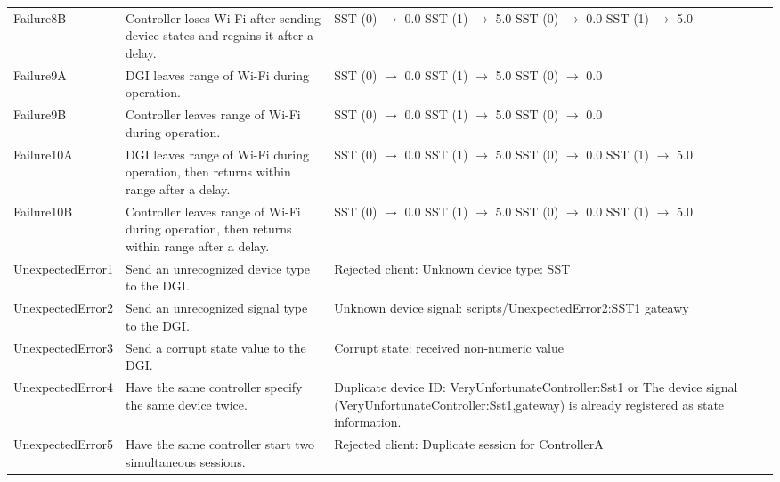 \documentclass{article}
\begin{document}
\begin{center}
\begin{footnotesize}
\begin{longtable}{|p{3cm}|p{4cm}|p{10cm}|c|}
    Failure8B & Controller loses Wi-Fi after sending device states and regains it after a delay. & SST (0) $\rightarrow$ 0.0 \newline SST (1) $\rightarrow$ 5.0 \newline SST (0) $\rightarrow$ 0.0 \newline SST (1) $\rightarrow$ 5.0 & \\
    Failure9A & DGI leaves range of Wi-Fi during operation. & SST (0) $\rightarrow$ 0.0 \newline SST (1) $\rightarrow$ 5.0 \newline SST (0) $\rightarrow$ 0.0 & \\
    Failure9B & Controller leaves range of Wi-Fi during operation. & SST (0) $\rightarrow$ 0.0 \newline SST (1) $\rightarrow$ 5.0 \newline SST (0) $\rightarrow$ 0.0 & \\
    Failure10A & DGI leaves range of Wi-Fi during operation, then returns within range after a delay. & SST (0) $\rightarrow$ 0.0 \newline SST (1) $\rightarrow$ 5.0 \newline SST (0) $\rightarrow$ 0.0 \newline SST (1) $\rightarrow$ 5.0 & \\
    Failure10B & Controller leaves range of Wi-Fi during operation, then returns within range after a delay. & SST (0) $\rightarrow$ 0.0 \newline SST (1) $\rightarrow$ 5.0 \newline SST (0) $\rightarrow$ 0.0 \newline SST (1) $\rightarrow$ 5.0 & \\
    UnexpectedError1 & Send an unrecognized device type to the DGI. & Rejected client: Unknown device type: SST & \\
    UnexpectedError2 & Send an unrecognized signal type to the DGI. & Unknown device signal: scripts/UnexpectedError2:SST1 gateawy & \\
    UnexpectedError3 & Send a corrupt state value to the DGI. & Corrupt state: received non-numeric value & \\
    UnexpectedError4 & Have the same controller specify the same device twice. & Duplicate device ID: VeryUnfortunateController:Sst1 or The device signal (VeryUnfortunateController:Sst1,gateway) is already registered as state information. & \\
    UnexpectedError5 & Have the same controller start two simultaneous sessions. & Rejected client: Duplicate session for ControllerA & \\

\end{longtable}
\end{footnotesize}
\end{center}
\end{document}
